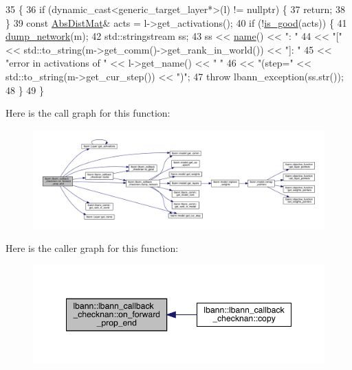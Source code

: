 \begin{DoxyCode}
35                                                                     \{
36   \textcolor{keywordflow}{if} (dynamic\_cast<generic\_target\_layer*>(l) != \textcolor{keyword}{nullptr}) \{
37     \textcolor{keywordflow}{return};
38   \}
39   \textcolor{keyword}{const} \hyperlink{base_8hpp_a9a697a504ae84010e7439ffec862b470}{AbsDistMat}& acts = l->get\_activations();
40   \textcolor{keywordflow}{if} (!\hyperlink{classlbann_1_1lbann__callback__checknan_ac74f7f665823d0500875b9740aaccabc}{is\_good}(acts)) \{
41     \hyperlink{classlbann_1_1lbann__callback__checknan_a335713a3df9194f657f98cccd2f695f5}{dump\_network}(m);
42     std::stringstream ss;
43     ss << \hyperlink{classlbann_1_1lbann__callback__checknan_ab42c997a06058c3535792408fdd5fed8}{name}() << \textcolor{stringliteral}{": "}
44        << \textcolor{stringliteral}{"["} << std::to\_string(m->get\_comm()->get\_rank\_in\_world()) << \textcolor{stringliteral}{"]: "}
45        << \textcolor{stringliteral}{"error in activations of "} << l->get\_name() << \textcolor{stringliteral}{" "}
46        << \textcolor{stringliteral}{"(step="} << std::to\_string(m->get\_cur\_step()) << \textcolor{stringliteral}{")"};
47     \textcolor{keywordflow}{throw} lbann\_exception(ss.str());
48   \}
49 \}
\end{DoxyCode}
Here is the call graph for this function\+:\nopagebreak
\begin{figure}[H]
\begin{center}
\leavevmode
\includegraphics[width=350pt]{classlbann_1_1lbann__callback__checknan_a09388ae76566a6a93c957ab76cd54dcd_cgraph}
\end{center}
\end{figure}
Here is the caller graph for this function\+:\nopagebreak
\begin{figure}[H]
\begin{center}
\leavevmode
\includegraphics[width=348pt]{classlbann_1_1lbann__callback__checknan_a09388ae76566a6a93c957ab76cd54dcd_icgraph}
\end{center}
\end{figure}
